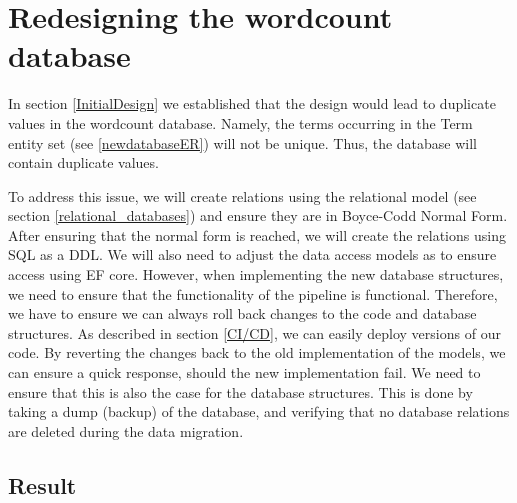 \section{Redesigning the wordcount database}
In section \ref{InitialDesign} we established that the design would lead to duplicate values in the wordcount database.
Namely, the terms occurring in the Term entity set (see \ref{newdatabaseER}) will not be unique. 
Thus, the database will contain duplicate values.
 
To address this issue, we will create relations using the relational model (see section \ref{relational_databases}) and ensure they are in Boyce-Codd Normal Form.
After ensuring that the normal form is reached, we will create the relations using SQL as a DDL.
We will also need to adjust the data access models as to ensure access using EF core. However, when implementing the new database structures, we need to ensure that the functionality of the pipeline is functional. 
Therefore, we have to ensure we can always roll back changes to the code and database structures.
As described in section \ref{CI/CD}, we can easily deploy versions of our code. By reverting the changes back to the old implementation of the models, we can ensure a quick response, should the new implementation fail.
We need to ensure that this is also the case for the database structures. 
This is done by taking a dump (backup) of the database, and verifying that no database relations are deleted during the data migration.




\subsection{Result}
